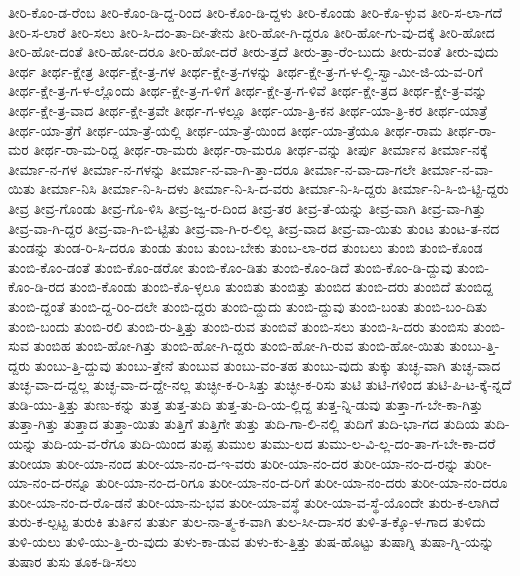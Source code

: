{ತೀರಿ-ಕೊಂ-ಡ-ರೆಂಬ
ತೀರಿ-ಕೊಂ-ಡಿ-ದ್ದ-ರಿಂದ
ತೀರಿ-ಕೊಂ-ಡಿ-ದ್ದಳು
ತೀರಿ-ಕೊಂಡು
ತೀರಿ-ಕೊ-ಳ್ಳುವ
ತೀರಿ-ಸ-ಲಾ-ಗದೆ
ತೀರಿ-ಸ-ಲಾರೆ
ತೀರಿ-ಸಲು
ತೀರಿ-ಸಿ-ದಂ-ತಾ-ದೀ-ತೇನು
ತೀರಿ-ಹೋ-ಗಿ-ದ್ದರೂ
ತೀರಿ-ಹೋ-ಗು-ವು-ದಕ್ಕೆ
ತೀರಿ-ಹೋದ
ತೀರಿ-ಹೋ-ದಂತೆ
ತೀರಿ-ಹೋ-ದರೂ
ತೀರಿ-ಹೋ-ದರೆ
ತೀರು-ತ್ತದೆ
ತೀರು-ತ್ತಾ-ರೆಂ-ಬುದು
ತೀರು-ವಂತೆ
ತೀರು-ವುದು
ತೀರ್ಥ
ತೀರ್ಥ-ಕ್ಷೇತ್ರ
ತೀರ್ಥ-ಕ್ಷೇ-ತ್ರ-ಗಳ
ತೀರ್ಥ-ಕ್ಷೇ-ತ್ರ-ಗಳನ್ನು
ತೀರ್ಥ-ಕ್ಷೇ-ತ್ರ-ಗ-ಳ-ಲ್ಲಿ-ಸ್ವಾ-ಮೀ-ಜಿ-ಯ-ವ-ರಿಗೆ
ತೀರ್ಥ-ಕ್ಷೇ-ತ್ರ-ಗ-ಳ-ಲ್ಲೊಂದು
ತೀರ್ಥ-ಕ್ಷೇ-ತ್ರ-ಗ-ಳಿಗೆ
ತೀರ್ಥ-ಕ್ಷೇ-ತ್ರ-ಗ-ಳಿವೆ
ತೀರ್ಥ-ಕ್ಷೇ-ತ್ರದ
ತೀರ್ಥ-ಕ್ಷೇ-ತ್ರ-ವನ್ನು
ತೀರ್ಥ-ಕ್ಷೇ-ತ್ರ-ವಾದ
ತೀರ್ಥ-ಕ್ಷೇ-ತ್ರವೇ
ತೀರ್ಥ-ಗ-ಳಲ್ಲೂ
ತೀರ್ಥ-ಯಾ-ತ್ರಿ-ಕನ
ತೀರ್ಥ-ಯಾ-ತ್ರಿ-ಕರ
ತೀರ್ಥ-ಯಾತ್ರೆ
ತೀರ್ಥ-ಯಾ-ತ್ರೆಗೆ
ತೀರ್ಥ-ಯಾ-ತ್ರೆ-ಯಲ್ಲಿ
ತೀರ್ಥ-ಯಾ-ತ್ರೆ-ಯಿಂದ
ತೀರ್ಥ-ಯಾ-ತ್ರೆಯೂ
ತೀರ್ಥ-ರಾಮ
ತೀರ್ಥ-ರಾ-ಮರ
ತೀರ್ಥ-ರಾ-ಮ-ರಿದ್ದ
ತೀರ್ಥ-ರಾ-ಮರು
ತೀರ್ಥ-ರಾ-ಮರೂ
ತೀರ್ಥ-ವನ್ನು
ತೀರ್ಪು
ತೀರ್ಮಾನ
ತೀರ್ಮಾ-ನಕ್ಕೆ
ತೀರ್ಮಾ-ನ-ಗಳ
ತೀರ್ಮಾ-ನ-ಗಳನ್ನು
ತೀರ್ಮಾ-ನ-ವಾ-ಗಿ-ತ್ತಾ-ದರೂ
ತೀರ್ಮಾ-ನ-ವಾ-ದಾ-ಗಲೇ
ತೀರ್ಮಾ-ನ-ವಾ-ಯಿತು
ತೀರ್ಮಾ-ನಿಸಿ
ತೀರ್ಮಾ-ನಿ-ಸಿ-ದಳು
ತೀರ್ಮಾ-ನಿ-ಸಿ-ದ-ವರು
ತೀರ್ಮಾ-ನಿ-ಸಿ-ದ್ದರು
ತೀರ್ಮಾ-ನಿ-ಸಿ-ಬಿ-ಟ್ಟಿ-ದ್ದರು
ತೀವ್ರ
ತೀವ್ರ-ಗೊಂಡು
ತೀವ್ರ-ಗೊ-ಳಿಸಿ
ತೀವ್ರ-ಜ್ವ-ರ-ದಿಂದ
ತೀವ್ರ-ತರ
ತೀವ್ರ-ತೆ-ಯನ್ನು
ತೀವ್ರ-ವಾಗಿ
ತೀವ್ರ-ವಾ-ಗಿತ್ತು
ತೀವ್ರ-ವಾ-ಗಿ-ದ್ದರ
ತೀವ್ರ-ವಾ-ಗಿ-ಬಿ-ಟ್ಟಿತು
ತೀವ್ರ-ವಾ-ಗಿ-ರ-ಲಿಲ್ಲ
ತೀವ್ರ-ವಾದ
ತೀವ್ರ-ವಾ-ಯಿತು
ತುಂಟ
ತುಂಟ-ತ-ನದ
ತುಂಡನ್ನು
ತುಂಡ-ರಿ-ಸಿ-ದರೂ
ತುಂಡು
ತುಂಬ
ತುಂಬ-ಬೇಕು
ತುಂಬ-ಲಾ-ರದ
ತುಂಬಲು
ತುಂಬಿ
ತುಂಬಿ-ಕೊಂಡ
ತುಂಬಿ-ಕೊಂ-ಡಂತೆ
ತುಂಬಿ-ಕೊಂ-ಡರೋ
ತುಂಬಿ-ಕೊಂ-ಡಿತು
ತುಂಬಿ-ಕೊಂ-ಡಿದೆ
ತುಂಬಿ-ಕೊಂ-ಡಿ-ದ್ದುವು
ತುಂಬಿ-ಕೊಂ-ಡಿ-ರದ
ತುಂಬಿ-ಕೊಂಡು
ತುಂಬಿ-ಕೊ-ಳ್ಳಲೂ
ತುಂಬಿತು
ತುಂಬಿತ್ತು
ತುಂಬಿದ
ತುಂಬಿ-ದರು
ತುಂಬಿದೆ
ತುಂಬಿದ್ದ
ತುಂಬಿ-ದ್ದಂತೆ
ತುಂಬಿ-ದ್ದ-ರಿಂ-ದಲೇ
ತುಂಬಿ-ದ್ದರು
ತುಂಬಿ-ದ್ದುದು
ತುಂಬಿ-ದ್ದುವು
ತುಂಬಿ-ಬಂತು
ತುಂಬಿ-ಬಂ-ದಿತು
ತುಂಬಿ-ಬಂದು
ತುಂಬಿ-ರಲಿ
ತುಂಬಿ-ರು-ತ್ತಿತ್ತು
ತುಂಬಿ-ರುವ
ತುಂಬಿವೆ
ತುಂಬಿ-ಸಲು
ತುಂಬಿ-ಸಿ-ದರು
ತುಂಬಿಸು
ತುಂಬಿ-ಸುವ
ತುಂಬಿಹ
ತುಂಬಿ-ಹೋ-ಗಿತ್ತು
ತುಂಬಿ-ಹೋ-ಗಿ-ದ್ದರು
ತುಂಬಿ-ಹೋ-ಗಿ-ರುವ
ತುಂಬಿ-ಹೋ-ಯಿತು
ತುಂಬು-ತ್ತಿ-ದ್ದರು
ತುಂಬು-ತ್ತಿ-ದ್ದುವು
ತುಂಬು-ತ್ತೇನೆ
ತುಂಬುವ
ತುಂಬು-ವಂ-ತಹ
ತುಂಬು-ವುದು
ತುಕ್ಕು
ತುಚ್ಛ-ವಾಗಿ
ತುಚ್ಛ-ವಾದ
ತುಚ್ಛ-ವಾ-ದ-ದ್ದಲ್ಲ
ತುಚ್ಛ-ವಾ-ದ-ದ್ದೇ-ನಲ್ಲ
ತುಚ್ಛೀ-ಕ-ರಿ-ಸಿತ್ತು
ತುಚ್ಛೀ-ಕ-ರಿಸು
ತುಟಿ
ತುಟಿ-ಗಳಿಂದ
ತುಟಿ-ಪಿ-ಟ-ಕ್ಕೆ-ನ್ನದೆ
ತುಡಿ-ಯು-ತ್ತಿತ್ತು
ತುಣು-ಕನ್ನು
ತುತ್ತ
ತುತ್ತ-ತುದಿ
ತುತ್ತ-ತು-ದಿ-ಯ-ಲ್ಲಿದ್ದ
ತುತ್ತ-ನ್ನಿ-ಡುವು
ತುತ್ತಾ-ಗ-ಬೇ-ಕಾ-ಗಿತ್ತು
ತುತ್ತಾ-ಗಿತ್ತು
ತುತ್ತಾದ
ತುತ್ತಾ-ಯಿತು
ತುತ್ತಿಗೆ
ತುತ್ತಿಗೇ
ತುತ್ತು
ತುದಿ-ಗಾ-ಲಿ-ನಲ್ಲಿ
ತುದಿಗೆ
ತುದಿ-ಭಾ-ಗದ
ತುದಿಯ
ತುದಿ-ಯನ್ನು
ತುದಿ-ಯ-ವ-ರೆಗೂ
ತುದಿ-ಯಿಂದ
ತುಪ್ಪ
ತುಮುಲ
ತುಮು-ಲದ
ತುಮು-ಲ-ವಿ-ಲ್ಲ-ದಂ-ತಾ-ಗ-ಬೇ-ಕಾ-ದರೆ
ತುರೀಯಾ
ತುರೀ-ಯಾ-ನಂದ
ತುರೀ-ಯಾ-ನಂ-ದ-ಇ-ವರು
ತುರೀ-ಯಾ-ನಂ-ದರ
ತುರೀ-ಯಾ-ನಂ-ದ-ರನ್ನು
ತುರೀ-ಯಾ-ನಂ-ದ-ರನ್ನೂ
ತುರೀ-ಯಾ-ನಂ-ದ-ರಿಗೂ
ತುರೀ-ಯಾ-ನಂ-ದ-ರಿಗೆ
ತುರೀ-ಯಾ-ನಂ-ದರು
ತುರೀ-ಯಾ-ನಂ-ದರೂ
ತುರೀ-ಯಾ-ನಂ-ದ-ರೊ-ಡನೆ
ತುರೀ-ಯಾ-ನು-ಭವ
ತುರೀ-ಯಾ-ವಸ್ಥೆ
ತುರೀ-ಯಾ-ವ-ಸ್ಥೆ-ಯೊಂದೇ
ತುರು-ಕ-ಲಾಗಿದೆ
ತುರು-ಕ-ಲ್ಪಟ್ಟ
ತುರುಕಿ
ತುರ್ತಿನ
ತುರ್ತು
ತುಲ-ನಾ-ತ್ಮ-ಕ-ವಾಗಿ
ತುಲ-ಸೀ-ದಾ-ಸರ
ತುಳಿ-ತ-ಕ್ಕೊ-ಳ-ಗಾದ
ತುಳಿದು
ತುಳಿ-ಯಲು
ತುಳಿ-ಯು-ತ್ತಿ-ರು-ವುದು
ತುಳು-ಕಾ-ಡುವ
ತುಳು-ಕು-ತ್ತಿತ್ತು
ತುಷ-ಹೊಟ್ಟು
ತುಷಾಗ್ನಿ
ತುಷಾ-ಗ್ನಿ-ಯನ್ನು
ತುಷಾರ
ತುಸು
ತೂಕ-ಡಿ-ಸಲು
}
